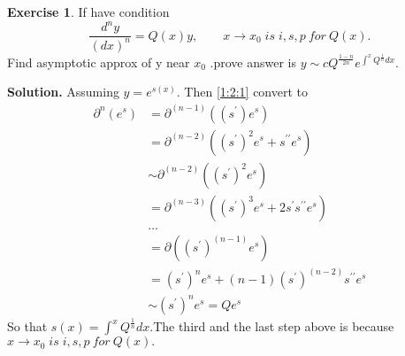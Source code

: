 \documentclass[a4paper]{book}
\newenvironment{solution}%
{\noindent\textbf{Solution.}}%
{\qedhere}
\numberwithin{equation}{chapter}
\theoremstyle{definition}
\newtheorem{exc}[exm]{Exercise}
\begin{document}
\begin{multicols}{2}
\begin{exc}
	If have condition 
	\begin{equation}\label{1:2:1}
		\frac{d^{n} y}{(dx)^n} = Q(x)y,\qquad x \rightarrow x_0\; is \;i,s,p\ for\ Q(x).
	\end{equation}
	Find asymptotic approx of y near $x_0$ .prove answer is $ y \sim c Q^{\frac{1-n}{2n}}e^{\int^x Q^{\frac{1}{n}}dx} $.
\end{exc}

\begin{solution}
	Assuming $ y = e^{s(x)} $. Then \ref{1:2:1} convert to 
	\begin{equation}
		\begin{aligned}
		\partial^n (e^s) &= \partial^(n-1) ((s^\prime) e^s) \\
		&= \partial^(n-2) ((s^\prime)^2 e^s + s^{\prime \prime} e^s) \\
		&\sim \partial^(n-2)((s^\prime)^2 e^s) \\
		&= \partial^(n-3) ((s^\prime)^3 e^s + 2s^\prime s^{\prime \prime} e^s) \\
		&\dots \\
		&=\partial ((s^\prime)^(n-1) e^s) \\
		&=(s^\prime)^n e^s + (n-1)(s^\prime)^(n-2) s^{\prime \prime} e^s \\
		&\sim (s^\prime)^n e^s = Q e^s
		\end{aligned}
	\end{equation}
	So that $ s(x) = \int^x Q^{\frac{1}{n}}dx$.The third and the last step above is because $x \rightarrow x_0\; is \;i,s,p\ for\ Q(x).$
	

\end{solution}
\end{multicols}
\end{document}
